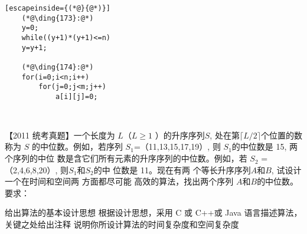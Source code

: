 \begin{questions}[strp]
\begin{bbox}
\begin{lstlisting}[escapeinside={(*@}{@*)}]
    (*@\ding{173}:@*)
    y=0;
    while((y+1)*(y+1)<=n)
    y=y+1;

    (*@\ding{174}:@*)
    for(i=0;i<n;i++)
        for(j=0;j<m;j++)
            a[i][j]=0;
    
        
        \end{lstlisting}
    \end{bbox}

    \begin{bbox}
        \question[2] 【2011 统考真题】一个长度为 $L$（$L\geqslant 1$ ）的升序序列$ S$, 处在第$\lceil L/2\rceil $个位置的数称为 $S$
        的中位数。例如，若序列 $S_1$=（11,13,15,17,19）, 则 $S_1$的中位数是 15, 两 个序列的中位
        数是含它们所有元素的升序序列的中位数。例如，若 $S_2$ =（2,4,6,8,20）, 则$S_1$和$S_2$的中
        位数是 11。现在有两 个等长升序序列$A$和$B$, 试设计一个在时间和空间两 方面都尽可能
        高效的算法，找出两个序列 $A$和$B$的中位数。要求：
        \begin{subquestions}
            \subquestion 给出算法的基本设计思想
            \subquestion  根据设计思想，采用 C 或 C++或 Java 语言描述算法，关键之处给出注释
            \subquestion 说明你所设计算法的时间复杂度和空间复杂度
        \end{subquestions}
    \end{bbox}
\end{questions}
    